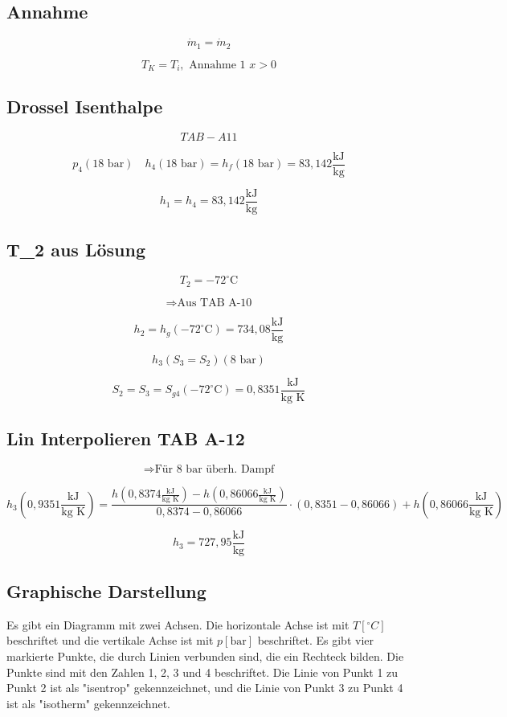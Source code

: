 \subsection*{Annahme}

\[
\dot{m}_1 = \dot{m}_2
\]

\[
T_K = T_i, \text{ Annahme 1 } x > 0
\]

\subsection*{Drossel Isenthalpe}

\[
TAB - A11
\]

\[
p_4 (18 \text{ bar}) \quad h_4 (18 \text{ bar}) = h_f (18 \text{ bar}) = 83,142 \frac{\text{kJ}}{\text{kg}}
\]

\[
h_1 = h_4 = 83,142 \frac{\text{kJ}}{\text{kg}}
\]

\subsection*{T_2 aus Lösung}

\[
T_2 = -72^\circ \text{C}
\]

\[
\Rightarrow \text{Aus TAB A-10}
\]

\[
h_2 = h_g (-72^\circ \text{C}) = 734,08 \frac{\text{kJ}}{\text{kg}}
\]

\[
h_3 (S_3 = S_2) (8 \text{ bar})
\]

\[
S_2 = S_3 = S_{g4} (-72^\circ \text{C}) = 0,8351 \frac{\text{kJ}}{\text{kg K}}
\]

\subsection*{Lin Interpolieren TAB A-12}

\[
\Rightarrow \text{Für 8 bar überh. Dampf}
\]

\[
h_3 (0,9351 \frac{\text{kJ}}{\text{kg K}}) = \frac{h \left( 0,8374 \frac{\text{kJ}}{\text{kg K}} \right) - h \left( 0,86066 \frac{\text{kJ}}{\text{kg K}} \right)}{0,8374 - 0,86066} \cdot (0,8351 - 0,86066) + h \left( 0,86066 \frac{\text{kJ}}{\text{kg K}} \right)
\]

\[
h_3 = 727,95 \frac{\text{kJ}}{\text{kg}}
\]

\subsection*{Graphische Darstellung}

Es gibt ein Diagramm mit zwei Achsen. Die horizontale Achse ist mit $T [^\circ C]$ beschriftet und die vertikale Achse ist mit $p [\text{bar}]$ beschriftet. Es gibt vier markierte Punkte, die durch Linien verbunden sind, die ein Rechteck bilden. Die Punkte sind mit den Zahlen 1, 2, 3 und 4 beschriftet. Die Linie von Punkt 1 zu Punkt 2 ist als "isentrop" gekennzeichnet, und die Linie von Punkt 3 zu Punkt 4 ist als "isotherm" gekennzeichnet.

